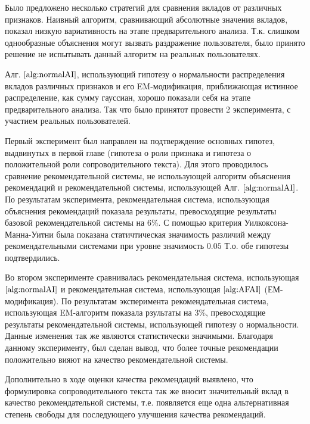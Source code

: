 \documentclass[12pt,a4paper]{report}
\begin{document}
Было предложено несколько стратегий для сравнения вкладов от различных признаков. Наивный алгоритм, сравнивающий абсолютные значения вкладов, показал низкую вариативность на этапе предварительного анализа. Т.к. слишком однообразные объяснения могут вызвать раздражение пользователя, было принято решение не испытывать данный алгоритм на реальных пользователях.

Алг. $\ref{alg:normalAI}$, использующий гипотезу о нормальности распределения вкладов различных признаков и его EM-модификация, приближающая истинное распределение, как сумму гауссиан, хорошо показали себя на этапе предварительного анализа. Так что было принятот провести 2 эксперимента, с участием реальных пользователей.

Первый эксперимент был направлен на подтверждение основных гипотез, выдвинутых в первой главе (гипотеза о роли признака и гипотеза о положительной роли сопроводительного текста). Для этого проводилось сравнение рекомендательной системы, не использующей алгоритм объяснения рекомендаций и рекомендательной системы, использующей Алг. $\ref{alg:normalAI}$. По результатам эксперимента, рекомендательная система, использующая объяснения рекомендаций показала результаты, превосходящие результаты базовой рекомендательной системы на 6\%. С помощью критерия Уилкоксона-Манна-Уитни была показана статичтическая значимость различий между рекомендательными системами при уровне значимость $0.05$ Т.о. обе гипотезы подтвердились.

Во втором эксперименте сравнивалась рекомендательная система, использующая $\ref{alg:normalAI}$ и рекомендательная система, использующая $\ref{alg:AFAI}$ (ЕМ-модификация). По результатам эксперимента рекомендательная система, использующая EM-алгоритм показала рзультаты на 3\%, превосходящие результаты рекомендательной системы, использующей гипотезу о нормальности. Данные изменения так же являются статистически значимыми. Благодаря данному эксперименту, был сделан вывод, что более точные рекомендации положительно вияют на качество рекомендательной системы.

Дополнительно в ходе оценки качества рекомендаций выявлено, что формулировка сопроводительного текста так же вносит значительный вклад в качество рекомендательной системы, т.е. появляется еще одна альтернативная степень свободы для последующего улучшения качества рекомендаций.

  
\end{document}
